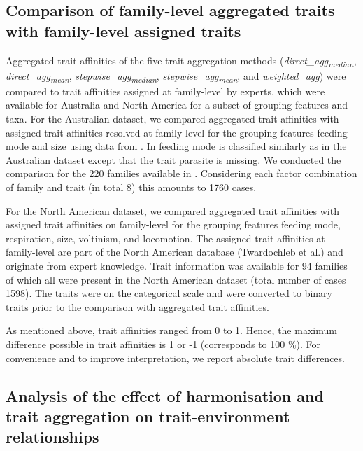 \documentclass{article}
\begin{document}

\subsection*{Comparison of family-level aggregated traits with family-level assigned traits}

Aggregated trait affinities of the five trait aggregation methods (\textit{direct\_agg\textsubscript{median}}, \textit{direct\_agg\textsubscript{mean}}, \textit{stepwise\_agg\textsubscript{median}}, \textit{stepwise\_agg\textsubscript{mean}}, and \textit{weighted\_agg}) were compared to trait affinities assigned at family-level by experts, which were available for Australia and North America for a subset of grouping features and taxa. For the Australian dataset, we compared aggregated trait affinities with assigned trait affinities resolved at family-level for the grouping features feeding mode and size using data from \citet{chessman_dissolved-oxygen_2018}. In \citet{chessman_dissolved-oxygen_2018} feeding mode is classified similarly as in the Australian dataset except that the trait parasite is missing. We conducted the comparison for the 220 families available in \citet{chessman_dissolved-oxygen_2018}. Considering each factor combination of family and trait (in total 8) this amounts to 1760 cases.

For the North American dataset, we compared aggregated trait affinities with assigned trait affinities on family-level for the grouping features feeding mode, respiration, size, voltinism, and locomotion. The assigned trait affinities at family-level are part of the North American database (Twardochleb et al.) and originate from expert knowledge. Trait information was available for 94 families of which all were present in the North American dataset (total number of cases 1598). The traits were on the categorical scale and were converted to binary traits prior to the comparison with aggregated trait affinities.

As mentioned above, trait affinities ranged from 0 to 1. Hence, the maximum difference possible in trait affinities is 1 or -1 (corresponds to 100 \%). For convenience and to improve interpretation, we report absolute trait differences.



\subsection*{Analysis of the effect of harmonisation and trait aggregation on trait-environment relationships}
\end{document}
